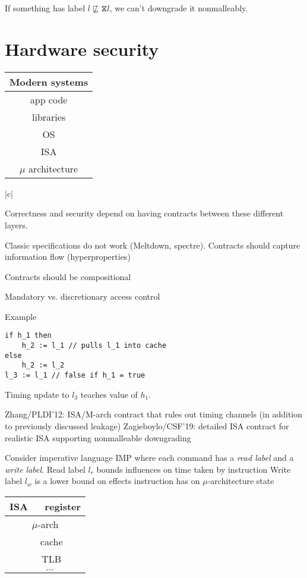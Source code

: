 \documentclass{article}
\newcommand{\refl}{\hourglass}
\begin{document}
If something has label $l \not\sqsubseteq \refl l$, we can't downgrade it nonmalleably.

\section{Hardware security}
\begin{tabular}{|c|}
Modern systems \\
\hline
app code \\
\hline
libraries \\ 
\hline
OS \\
\hline
ISA \\ 
\hline
$\mu$ architecture \\
\end{tabular}{|c|}

Correctness and security depend on having contracts between these different layers. 

Classic specifications do not work (Meltdown, spectre). Contracts should capture information flow (hyperproperties)

Contracts should be compositional

Mandatory vs. discretionary access control

Example
\begin{lstlisting}[mathescape]
if h_1 then
    h_2 := l_1 // pulls l_1 into cache
else 
    h_2 := l_2
l_3 := l_1 // false if h_1 = true
\end{lstlisting}

Timing update to $l_3$ teaches value of $h_1$.

Zhang/PLDI'12: ISA/M-arch contract that rules out timing channels (in addition to previously discussed leakage)
Zagieboylo/CSF'19: detailed ISA contract for realistic ISA supporting nonmalleable downgrading

Consider imperative language IMP where each command has a \emph{read label} and a \emph{write label}.
Read label $l_r$ bounds influences on time taken by instruction
Write label $l_w$ is a lower bound on effects instruction has on $\mu$-architecture state
\begin{tabular}{|c|}
\hline
ISA
$\quad$ register \\
\hline
$\mu$-arch \\
$\quad$ cache \\
$\quad$ TLB \\
$\quad \ldots$ \\
\hline
\end{tabular}
\end{document}
